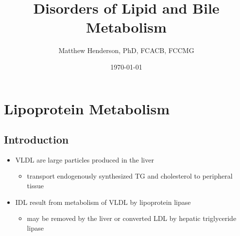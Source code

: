 \documentclass[12pt]{scrartcl}
\author{Matthew Henderson, PhD, FCACB, FCCMG}
\date{\today}
\title{Disorders of Lipid and Bile Metabolism}
\begin{document}
\maketitle
\tableofcontents



\section{Lipoprotein Metabolism}
\label{sec:org9c10e5d}
\subsection{Introduction}
\label{sec:org1eb499a}
\begin{itemize}
\item VLDL are large particles produced in the liver
\begin{itemize}
\item transport endogenously synthesized TG and cholesterol to peripheral tissue
\end{itemize}
\item IDL result from metabolism of VLDL by lipoprotein lipase
\begin{itemize}
\item may be removed by the liver or converted LDL by hepatic triglyceride lipase
\end{itemize}
\end{itemize}
\end{document}
